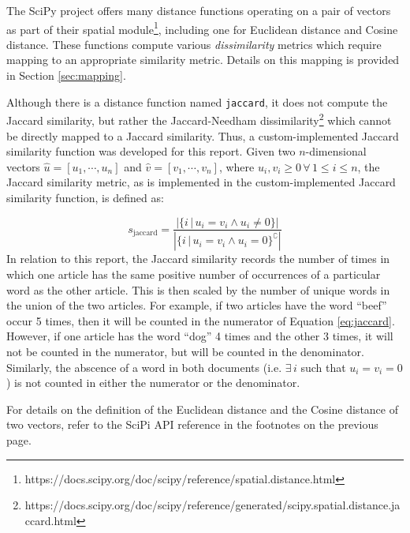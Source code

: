\documentclass[11pt]{article}
\begin{document}
The SciPy project \cite{scipy} offers many distance functions operating on a pair of vectors as part of their spatial module\footnote{
https://docs.scipy.org/doc/scipy/reference/spatial.distance.html
}, including one for Euclidean distance %
and Cosine distance. %
These functions compute various \emph{dissimilarity} metrics which require mapping to an appropriate similarity metric.
Details on this mapping is provided in Section \ref{sec:mapping}. 

Although there is a distance function named \texttt{jaccard}, it does not compute the Jaccard similarity, but rather the Jaccard-Needham dissimilarity\footnote{
https://docs.scipy.org/doc/scipy/reference/generated/scipy.spatial.distance.jaccard.html
} which cannot be directly mapped to a Jaccard similarity.
Thus, a custom-implemented Jaccard similarity function was developed for this report.
Given two $n$-dimensional vectors $\hat{u} = [ u_1, \cdots, u_n ]$ and $\hat{v} = [ v_1, \cdots, v_n ]$, where $u_i, v_i \ge 0 \, \forall \, 1 \le i \le n$, the Jaccard similarity metric, as is implemented in the custom-implemented Jaccard similarity function, is defined as:

\begin{equation} \label{eq:jaccard}
	s_{\text{jaccard}} = \frac{ \left| \{i \, | \, u_i = v_i \land u_i \ne 0 \} \right| }
	                          { \left| \{i \, | \, u_i = v_i \land u_i = 0 \}^\complement \right| }
\end{equation}
In relation to this report, the Jaccard similarity records the number of times in which one article has the same positive number of occurrences of a particular word as the other article.
This is then scaled by the number of unique words in the union of the two articles. For example, if two articles have the word ``beef'' occur 5 times, then it will be counted in the numerator of Equation \ref{eq:jaccard}.
However, if one article has the word ``dog'' 4 times and the other 3 times, it will not be counted in the numerator, but will be counted in the denominator.
Similarly, the abscence of a word in both documents (i.e. $\exists \, i$ such that $u_i = v_i = 0$) is not counted in either the numerator or the denominator.

For details on the definition of the Euclidean distance and the Cosine distance of two vectors, refer to the SciPi API reference in the footnotes on the previous page.
\end{document}
